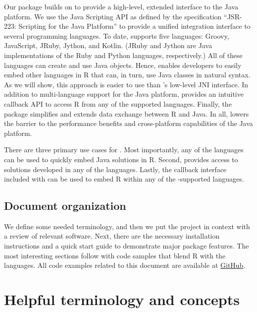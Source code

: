 Our  package builds on  to provide a high-level, extended interface to the Java platform. We use the Java Scripting API \citep{jsa} as defined by the specification “JSR-223: Scripting for the Java Platform” \citep{jsr223spec} to provide a unified integration interface to several programming languages. To date,  supports five languages: Groovy, JavaScript, JRuby, Jython, and Kotlin. (JRuby and Jython are Java implementations of the Ruby and Python languages, respectively.) All of these languages can create and use Java objects. Hence,  enables developers to easily embed other languages in R that can, in turn, use Java classes in natural syntax. As we will show, this approach is easier to use than 's low-level JNI interface. In addition to multi-language support for the Java platform,  provides an intuitive callback API to access R from any of the supported languages. Finally, the  package simplifies and extends data exchange between R and Java. In all,  lowers the barrier to the performance benefits and cross-platform capabilities of the Java platform.

There are three primary use cases for . Most importantly, any of the  languages can be used to quickly embed Java solutions in R. Second,  provides access to solutions developed in any of the  languages. Lastly, the callback interface included with  can be used to embed R within any of the -supported languages.

\subsection{Document organization}

We define some needed terminology, and then we put the  project in context with a review of relevant software. Next, there are the necessary installation instructions and a quick start guide to demonstrate major package features. The most interesting sections follow with code samples that blend R with the  languages. All code examples related to this document are available at \href{https://github.com/floidgilbert/jsr223/tree/master/examples}{GitHub}.

\section{Helpful terminology and concepts}

